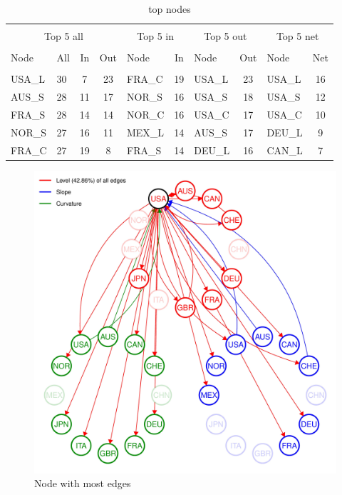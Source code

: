 \documentclass{article}
\begin{document}

\begin{table}[h]
\caption{top nodes} %
\fontsize{10}{10}\selectfont
\setlength{\tabcolsep}{12pt}
\centering%
\begin{tabular}{l  lcc  lc lc  lc}%

\hline\hline \\ [-1.5ex]                         %


\multicolumn{4}{c}{Top 5 all}					&	\multicolumn{2}{c}{Top 5 in}			&	\multicolumn{2}{c}{Top 5 out}			&	\multicolumn{2}{c}{Top 5 net}	\\	
\hline \\ [-1.5ex]    
Node	&	All	&	In	&	Out	&	Node	&	In	&	Node	&	Out	&	Node	&	Net	\\
\hline \\ [-1.5ex]    
USA\_L&	30	&	7	&	23	&	FRA\_C	&	19	&	USA\_L	&	23	&	USA\_L	&	16	\\
AUS\_S	&	28	&	11	&	17	&	NOR\_S	&	16	&	USA\_S	&	18	&	USA\_S	&	12	\\
FRA\_S	&	28	&	14	&	14	&	NOR\_C	&	16	&	USA\_C	&	17	&	USA\_C	&	10	\\
NOR\_S	&	27	&	16	&	11	&	MEX\_L	&	14	&	AUS\_S	&	17	&	DEU\_L	&	9	\\
FRA\_C	&	27	&	19	&	8	&	FRA\_S	&	14	&	DEU\_L	&	16	&	CAN\_L	&	7	\\

\hline            
\end{tabular}
\label{table:nonlin}%
\end{table}




\begin{figure}[H]
\caption{Node with most edges}
\includegraphics[width=11.5cm]{USA_B_1_plot_2004-07-01_2019-12-31_0.01-page-001}
\centering
\end{figure}
\end{document}
